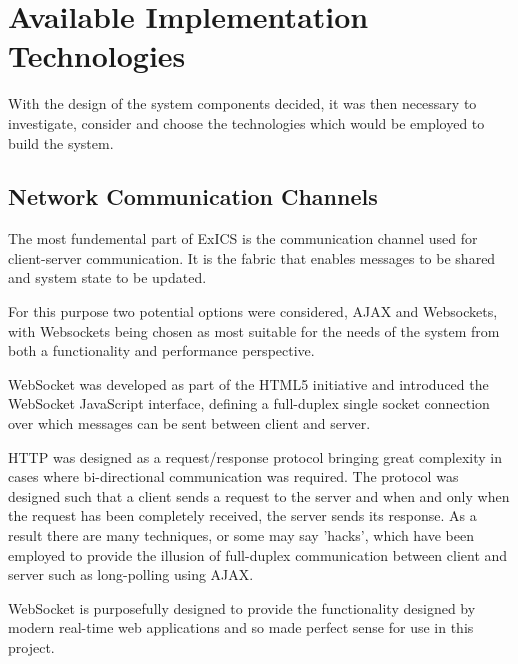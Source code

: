 \FloatBarrier

\section{Available Implementation Technologies}

With the design of the system components decided, it was then necessary to investigate, consider and choose the technologies which would be employed to build the system.

\subsection{Network Communication Channels}

The most fundemental part of ExICS is the communication channel used for client-server communication.  It is the fabric that enables messages to be shared and system state to be updated.

For this purpose two potential options were considered, AJAX and Websockets, with Websockets being chosen as most suitable for the needs of the system from both a functionality and performance perspective.

WebSocket was developed as part of the HTML5 initiative and introduced the WebSocket JavaScript interface, defining a full-duplex single socket connection over which messages can be sent between client and server.

HTTP was designed as a request/response protocol bringing great complexity in cases where bi-directional communication was required.  The protocol was designed such that a client sends a request to the server and when and only when the request has been completely received, the server sends its response. As a result there are many techniques, or some may say 'hacks'\cite{httpabuse}, which have been employed to provide the illusion of full-duplex communication between client and server such as long-polling using AJAX\cite{lpAjax}.

WebSocket is purposefully designed to provide the functionality designed by modern real-time web applications and so made perfect sense for use in this project.
% 

